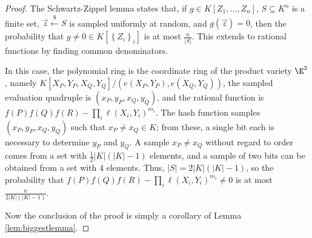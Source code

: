 \documentclass[11pt,letterpaper]{article}
\theoremstyle{definition}
\newcommand{\6}{\mathbf}
\newcommand{\7}{\mathcal}
\newcommand{\lsamp}{\xleftarrow{\$}}
\begin{document}
\begin{proof}

The Schwartz-Zippel lemma 
states that, if $g \in K[Z_1, \ldots, Z_n]$, $S \subseteq K^n$ is a finite set, $\vec{z} \lsamp S$ is sampled uniformly at random, and $g(\vec{z}) = 0$, then the probability that $g \neq 0 \in K[\left\{Z_i\right\}_i]$ is at most $\frac{n}{\left|S\right|}$. This extends to rational functions by finding common denominators.

In this case, the polynomial ring is the coordinate ring of the product variety $\E^2$, namely $K[X_P,Y_P,X_Q,Y_Q]/(e(X_P,Y_P), e(X_Q,Y_Q))$, the sampled evaluation quadruple is $(x_P,y_P,x_Q,y_Q)$, and the rational function is $f(P)f(Q)f(R) - \prod_i \ell(X_i,Y_i)^{m_i}$. The hash function samples $(x_P,y_P,x_Q,y_Q)$ such that $x_P \neq x_Q \in K$; from these, a single bit each is necessary to determine $y_P$ and $y_Q$. A sample $x_P \neq x_Q$ without regard to order comes from a set with $\frac{1}{2}\left|K\right|\left(\left|K\right|-1\right)$ elements, and a sample of two bits can be obtained from a set with $4$ elements. Thus, $\left|S\right| = 2\left|K\right|\left(\left|K\right|-1\right)$, so the probability that $f(P)f(Q)f(R) - \prod_i \ell(X_i,Y_i)^{m_i} \neq 0$ is at most $\frac{n}{2\left|K\right|\left(\left|K\right|-1\right)}$.

Now the conclusion of the proof is simply a corollary of Lemma \ref{lem:biggestlemma}.
\end{proof}

\end{document}
